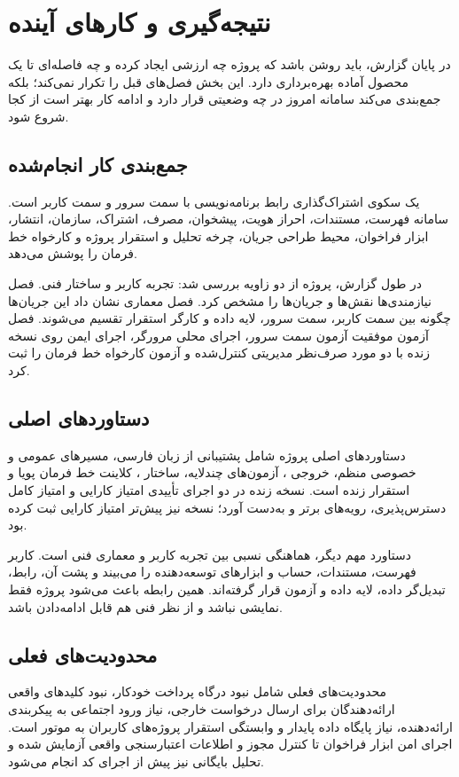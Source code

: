 \chapter{نتیجه‌گیری و کارهای آینده}

در پایان گزارش، باید روشن باشد که پروژه چه ارزشی ایجاد کرده و چه فاصله‌ای تا یک محصول آماده بهره‌برداری دارد. این بخش فصل‌های قبل را تکرار نمی‌کند؛ بلکه جمع‌بندی می‌کند سامانه امروز در چه وضعیتی قرار دارد و ادامه کار بهتر است از کجا شروع شود.

\section{جمع‌بندی کار انجام‌شده}
 یک سکوی اشتراک‌گذاری رابط برنامه‌نویسی با سمت سرور  و سمت کاربر  است. سامانه فهرست، مستندات، احراز هویت، پیشخوان، مصرف، اشتراک، سازمان، انتشار، ابزار فراخوان، محیط طراحی جریان، چرخه تحلیل و استقرار پروژه و کارخواه خط فرمان را پوشش می‌دهد.

در طول گزارش، پروژه از دو زاویه بررسی شد: تجربه کاربر و ساختار فنی. فصل نیازمندی‌ها نقش‌ها و جریان‌ها را مشخص کرد. فصل معماری نشان داد این جریان‌ها چگونه بین سمت کاربر، سمت سرور، لایه داده و کارگر استقرار تقسیم می‌شوند. فصل آزمون موفقیت  آزمون سمت سرور،  اجرای محلی مرورگر،  اجرای ایمن روی نسخه زنده با دو مورد صرف‌نظر مدیریتی کنترل‌شده و  آزمون کارخواه خط فرمان را ثبت کرد.

\section{دستاوردهای اصلی}
دستاوردهای اصلی پروژه شامل پشتیبانی از زبان فارسی، مسیرهای عمومی و خصوصی منظم، خروجی ، آزمون‌های چندلایه، ساختار ، کلاینت خط فرمان پویا و استقرار زنده  است. نسخه زنده  در دو اجرای تأییدی  امتیاز  کارایی و امتیاز کامل دسترس‌پذیری، رویه‌های برتر و  به‌دست آورد؛ نسخه  نیز پیش‌تر امتیاز کارایی  ثبت کرده بود.

دستاورد مهم دیگر، هماهنگی نسبی بین تجربه کاربر و معماری فنی است. کاربر فهرست، مستندات، حساب و ابزارهای توسعه‌دهنده را می‌بیند و پشت آن، رابط، تبدیل‌گر داده، لایه داده و آزمون قرار گرفته‌اند. همین رابطه باعث می‌شود پروژه فقط نمایشی نباشد و از نظر فنی هم قابل ادامه‌دادن باشد.

\section{محدودیت‌های فعلی}
محدودیت‌های فعلی شامل نبود درگاه پرداخت خودکار، نبود کلیدهای واقعی ارائه‌دهندگان برای ارسال درخواست خارجی، نیاز ورود اجتماعی به پیکربندی ارائه‌دهنده، نیاز پایگاه داده پایدار و وابستگی استقرار پروژه‌های کاربران به موتور  است. اجرای امن ابزار فراخوان تا کنترل مجوز و اطلاعات اعتبارسنجی واقعی آزمایش شده و تحلیل بایگانی نیز پیش از اجرای کد انجام می‌شود.

